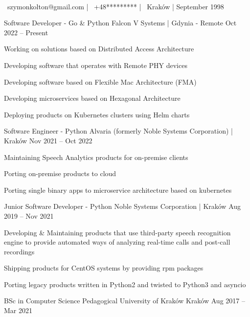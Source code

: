 \documentclass[]{awesome-cv}
\begin{document}
    
\begin{center}
	  \\
	\vspace{2mm}
	{\faEnvelope\ szymonkolton@gmail.com} | {\faMobile\ +48*********} | {\faMapMarker\ Kraków} | {September 1998}
\end{center}
\begin{cventries}

	\cventry
	{Software Developer - Go \& Python}
	{Falcon V Systems | }
	{Gdynia - Remote}
	{Oct 2022 – Present}
	{\begin{cvitems}
		\item {Working on solutions based on Distributed Access Architecture}
		\item {Developing software that operates with Remote PHY devices}
		\item {Developing software based on Flexible Mac Architecture (FMA)}
		\item {Developing microservices based on Hexagonal Architecture}
		\item {Deploying products on Kubernetes clusters using Helm charts}
		\end{cvitems}}
	\cventry
	{Software Engineer - Python}
	{Alvaria (formerly Noble Systems Corporation) | }
	{Kraków}
	{Nov 2021 – Oct 2022}
	{\begin{cvitems}
		\item {Maintaining Speech Analytics products for on-premise clients}
		\item {Porting on-premise products to cloud}
		\item {Porting single binary apps to microservice architecture based on kubernetes}
		\end{cvitems}}
	\cventry
	{Junior Software Developer - Python}
	{Noble Systems Corporation | }
	{Kraków}
	{Aug 2019 – Nov 2021}
	{\begin{cvitems}
		\item {Developing \& Maintaining products that use third-party speech recognition engine to provide automated ways of analyzing real-time calls and post-call recordings}
		\item {Shipping products for CentOS systems by providing rpm packages}
		\item {Porting legacy products written in Python2 and twisted to Python3 and asyncio}
		\end{cvitems}}
\end{cventries}
\begin{cventries}
	\cventry
	{BSc in Computer Science}
	{Pedagogical University of Kraków}
	{Kraków}
	{Aug 2017 – Mar 2021}
	{}
\end{cventries}
\end{document}
